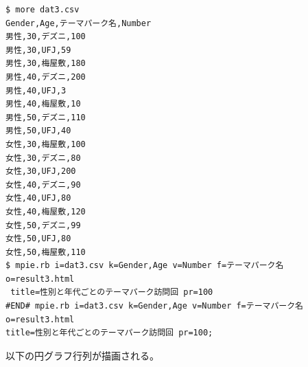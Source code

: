 \begin{noautoxspacing}
\begin{Verbatim}[baselinestretch=0.5,frame=single]
$ more dat3.csv
Gender,Age,テーマパーク名,Number
男性,30,デズニ,100
男性,30,UFJ,59
男性,30,梅屋敷,180
男性,40,デズニ,200
男性,40,UFJ,3
男性,40,梅屋敷,10
男性,50,デズニ,110
男性,50,UFJ,40
女性,30,梅屋敷,100
女性,30,デズニ,80
女性,30,UFJ,200
女性,40,デズニ,90
女性,40,UFJ,80
女性,40,梅屋敷,120
女性,50,デズニ,99
女性,50,UFJ,80
女性,50,梅屋敷,110
$ mpie.rb i=dat3.csv k=Gender,Age v=Number f=テーマパーク名 o=result3.html
 title=性別と年代ごとのテーマパーク訪問回 pr=100
#END# mpie.rb i=dat3.csv k=Gender,Age v=Number f=テーマパーク名 o=result3.html 
title=性別と年代ごとのテーマパーク訪問回 pr=100;
\end{Verbatim}
\end{noautoxspacing}

以下の円グラフ行列が描画される。

\begin{flushleft}
\end{flushleft}
